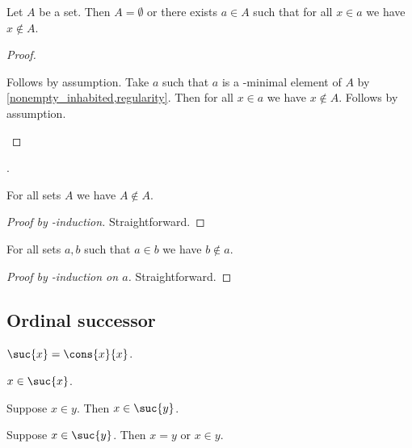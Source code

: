 \begin{theorem}[Foundation]\label{foundation}
    Let $A$ be a set.
    Then $A = \emptyset$ or there exists $a\in A$
    such that for all $x\in a$ we have $x\notin A$.
\end{theorem}
\begin{proof}
    \begin{byCase}
            Follows by assumption.
            Take $a$ such that $a$ is a \in-minimal element of $A$ by \cref{nonempty_inhabited,regularity}.
            Then for all $x\in a$ we have $x\notin A$.
            Follows by assumption.
    \end{byCase}
\end{proof}.

\begin{proposition}\label{in_irrefl}
    For all sets $A$ we have $A\not\in A$.
\end{proposition}
\begin{proof}[Proof by \in-induction]
    Straightforward.
\end{proof}

\begin{proposition}\label{in_asymmetric}
    For all sets $a, b$ such that $a\in b$ we have $b\notin a$.
\end{proposition}
\begin{proof}[Proof by \in-induction on $a$]
    Straightforward.
\end{proof}

\subsection{Ordinal successor}

\begin{definition}\label{suc}
    $\suc{x} = \cons{x}{x}$.
\end{definition}

\begin{proposition}\label{suc_intro_self}
    $x\in\suc{x}$.
\end{proposition}

\begin{proposition}\label{suc_intro_in}
    Suppose $x\in y$. Then $x\in\suc{y}$.
\end{proposition}

\begin{proposition}\label{suc_elim}
    Suppose $x\in\suc{y}$.
    Then $x = y$ or $x\in y$.
\end{proposition}

